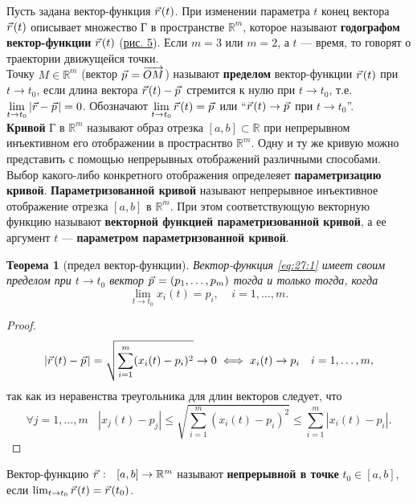 \documentclass[12pt]{report}
\numberwithin{equation}{section}
\newtheorem{theorem}{Теорема}[section]
\newcommand{\pvec}[1]{\vec{#1}\mkern2mu\vphantom{#1}}
\begin{document}
Пусть задана вектор-функция $\pvec{r}(t)$. При изменении параметра $t$ конец вектора $\pvec{r}(t)$ описывает множество Г в пространстве $\mathbb{R}^m$, которое называют \textbf{годографом вектор-функции} $\pvec{r}(t)$ (\hyperref[pic:27:1]{рис. 5}). Если $m = 3$ или $m = 2$, а $t$ --- время, то говорят о траектории движущейся точки.\\

Точку $M \in \mathbb{R}^m$ (вектор $\pvec{p} = \overrightarrow{OM}$) называют \textbf{пределом} вектор-функции $\pvec{r}(t)$ при $t \to t_0$, если длина вектора $\pvec{r}(t) - \pvec{p}$ стремится к нулю при $t \to t_0$, т.е. $\lim\limits_{t \to t_0} |\vec{r} - \pvec{p}| = 0$. Обозначают $\lim\limits_{t \to t_0}\pvec{r}(t) = \pvec{p}$ или ``$\pvec{r}(t) \to \pvec{p}$ при $t \to t_0$''.\\


\textbf{Кривой} Г в $\mathbb{R}^m$ называют образ отрезка $[a,b] \subset \mathbb{R}$ при непрерывном инъективном его отображении в простраснтво $\mathbb{R}^m$. Одну и ту же кривую можно представить с помощью непрерывных отображений различными способами. Выбор какого-либо конкретного отображения определеяет \textbf{параметризацию кривой}. \textbf{Параметризованной кривой} называют непрерывное инъективное отображение отрезка $[a,b]$ в $\mathbb{R}^m$. При этом соответствующую векторную функцию называют \textbf{векторной функцией параметризованной кривой}, а ее аргумент $t$ --- \textbf{параметром параметризованной кривой}.

\begin{theorem}[предел вектор-функции] \label{th:27:1}
Вектор-функция \eqref{eq:27:1} имеет своим пределом при $t \to t_0$ вектор $\pvec{p} = (p_1, \ldots, p_m)$ тогда и только тогда, когда
\[ \lim_{t \to t_0} x_i(t) = p_i,~~~~~ i = 1,\ldots, m.\]
\end{theorem}

\begin{proof}
\[ |\pvec{r}(t) - \pvec{p}| = \sqrt{\sum_{i=1}^{m} (x_i(t) - p_i)^2} \to 0 \iff x_i(t) \to p_i~~~ i = 1, \ldots, m,\]
так как из неравенства треугольника для длин векторов следует, что
\[ \forall j = 1, \ldots, m~~~~ |x_j(t) - p_j| \leqslant \sqrt{\sum_{i=1}^m (x_i(t) - p_i)^2} \leqslant \sum_{i=1}^m |x_i(t) - p_i|.\]
\end{proof}

Вектор-функцию $\pvec{r}: ~~ [a,b] \to \mathbb{R}^m$ называют \textbf{непрерывной в точке} $t_0 \in [a,b]$, если $\lim_{t \to t_0}\pvec{r}(t) = \pvec{r}(t_0)$.
\end{document}

